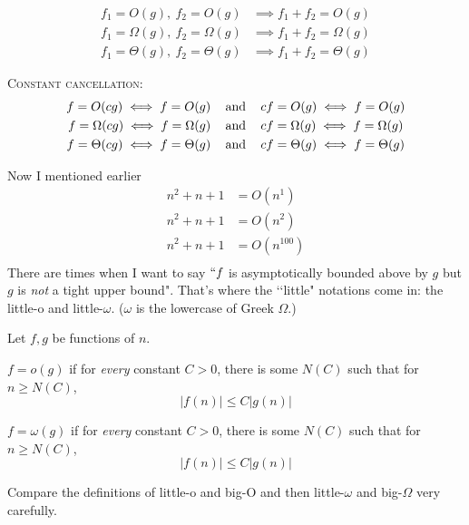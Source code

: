 \begin{cor}
    \begin{align*}
    f_1 = O(g), \ f_2 = O(g) &\implies f_1 + f_2 = O(g) \\
    f_1 = \Omega(g), \ f_2 = \Omega(g) &\implies f_1 + f_2 = \Omega(g) \\
    f_1 = \Theta(g), \ f_2 = \Theta(g) &\implies f_1 + f_2 = \Theta(g) 
    \end{align*}
\end{cor}

\begin{cor}
    \textsc{Constant cancellation:}
    \begin{align*}
      f = O(cg) \iff f = O(g)           &\text{ \,\,\, and \,\,\, } cf = O(g) \iff f = O(g) \\
      f = \Omega(cg) \iff f = \Omega(g) &\text{ \,\,\, and \,\,\, } cf = \Omega(g) \iff f = \Omega(g) \\
      f = \Theta(cg) \iff f = \Theta(g) &\text{ \,\,\, and \,\,\, } cf = \Theta(g) \iff f = \Theta(g)
    \end{align*}
\end{cor}

Now I mentioned earlier
\begin{align*}
n^2 + n + 1 &= O(n^1) \\
n^2 + n + 1 &= O(n^2) \\
n^2 + n + 1 &= O(n^{100}) \\
\end{align*}
There are times when I want to say $\lq\lq f$ is asymptotically bounded
above by $g$ but $g$ is \textit{not} a tight upper bound".
That's where  
the \lq\lq little" notations come in: 
the little-o and little-$\omega$.
($\omega$ is the lowercase of Greek $\Omega$.)

\begin{defn}
  Let $f,g$ be functions of $n$.
  \begin{myenum}
  \item
    $f = o(g)$
    if for \textit{every} constant $C > 0$, there is some $N(C)$ such that
    for $n \geq N(C)$,
    \[
    |f(n)| \leq C |g(n)|
    \]
  \item
    $f = \omega(g)$\tinysidebar{$\omega$}
    if for \textit{every} constant $C > 0$, there is some $N(C)$ such that
    for $n \geq N(C)$,
    \[
    |f(n)| \leq C |g(n)|
    \]
  \end{myenum}
   Compare the definitions of little-o and big-O and then
   little-$\omega$ and big-$\Omega$ very carefully.
\end{defn}


